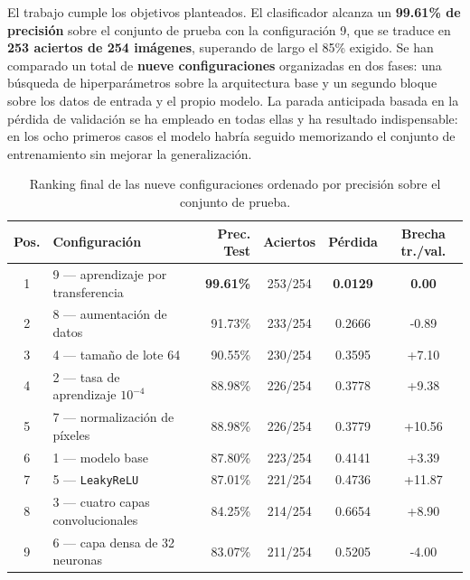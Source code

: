 \documentclass[11pt, a4paper]{article}
\begin{document}
El trabajo cumple los objetivos planteados. El clasificador alcanza un \textbf{99.61\% de precisión} sobre el conjunto de prueba con la configuración 9, que se traduce en \textbf{253 aciertos de 254 imágenes}, superando de largo el 85\% exigido. Se han comparado un total de \textbf{nueve configuraciones} organizadas en dos fases: una búsqueda de hiperparámetros sobre la arquitectura base y un segundo bloque sobre los datos de entrada y el propio modelo. La parada anticipada basada en la pérdida de validación se ha empleado en todas ellas y ha resultado indispensable: en los ocho primeros casos el modelo habría seguido memorizando el conjunto de entrenamiento sin mejorar la generalización.

\begin{table}[H]
\centering
\caption{Ranking final de las nueve configuraciones ordenado por precisión sobre el conjunto de prueba.}
\label{tab:ranking}
\footnotesize
\setlength{\tabcolsep}{3pt}
\begin{tabular}{c l r c c c}
\toprule
\textbf{Pos.} & \textbf{Configuración} & \textbf{Prec. Test} & \textbf{Aciertos} & \textbf{Pérdida} & \textbf{Brecha tr./val.} \\
\midrule
1 & 9 --- aprendizaje por transferencia & \textbf{99.61\%} & 253/254 & \textbf{0.0129} & \textbf{0.00} \\
2 & 8 --- aumentación de datos & 91.73\% & 233/254 & 0.2666 & -0.89 \\
3 & 4 --- tamaño de lote 64 & 90.55\% & 230/254 & 0.3595 & +7.10 \\
4 & 2 --- tasa de aprendizaje $10^{-4}$ & 88.98\% & 226/254 & 0.3778 & +9.38 \\
5 & 7 --- normalización de píxeles & 88.98\% & 226/254 & 0.3779 & +10.56 \\
6 & 1 --- modelo base & 87.80\% & 223/254 & 0.4141 & +3.39 \\
7 & 5 --- \texttt{LeakyReLU} & 87.01\% & 221/254 & 0.4736 & +11.87 \\
8 & 3 --- cuatro capas convolucionales & 84.25\% & 214/254 & 0.6654 & +8.90 \\
9 & 6 --- capa densa de 32 neuronas & 83.07\% & 211/254 & 0.5205 & -4.00 \\
\bottomrule
\end{tabular}
\setlength{\tabcolsep}{6pt}
\end{table}
\end{document}
